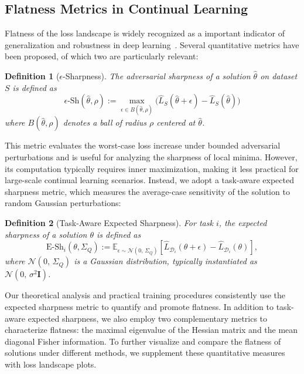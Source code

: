 \documentclass[letterpaper]{article} %
\newtheorem{definition}{Definition}
\begin{document}
\subsection{Flatness Metrics in Continual Learning}


Flatness of the loss landscape is widely recognized as a important indicator of generalization and robustness in deep learning~\citep{liVisualizingLossLandscape2018, foretSharpnessAwareMinimizationEfficiently2021}. Several quantitative metrics have been proposed, of which two are particularly relevant:

\begin{definition}[$\epsilon$-Sharpness]
The adversarial sharpness of a solution $\hat{\theta}$ on dataset $S$ is defined as
\begin{equation}
    \epsilon\text{-Sh}(\hat{\theta}, \rho) :=\max_{\epsilon \in B(\hat\theta, \rho)} \big( \hat{L}_{S}(\hat{\theta} + \epsilon) - \hat{L}_{S}(\hat{\theta}) \big)
\end{equation}
where $B(\hat\theta, \rho)$ denotes a ball of radius $\rho$ centered at $\hat\theta$.
\end{definition}

This metric evaluates the worst-case loss increase under bounded adversarial perturbations and is useful for analyzing the sharpness of local minima. However, its computation typically requires inner maximization, making it less practical for large-scale continual learning scenarios. Instead, we adopt a task-aware expected sharpness metric, which measures the average-case sensitivity of the solution to random Gaussian perturbations:

\begin{definition}[Task-Aware Expected Sharpness]
For task $i$, the expected sharpness of a solution $\theta$ is defined as
\begin{equation}
    \mathrm{E\text{-}Sh}_i(\theta, \Sigma_Q) := \mathbb{E}_{\epsilon \sim \mathcal{N}(0,\,\Sigma_Q)} \left[ \hat{L}_{\mathcal{D}_i}(\theta + \epsilon) - \hat{L}_{\mathcal{D}_i}(\theta) \right],
\end{equation}
where $\mathcal{N}(0,\,\Sigma_Q)$ is a Gaussian distribution, typically instantiated as $\mathcal{N}(0,\, \sigma^2 \mathbf{I})$.
\end{definition}

Our theoretical analysis and practical training procedures consistently use the expected sharpness metric to quantify and promote flatness. In addition to task-aware expected sharpness, we also employ two complementary metrics to characterize flatness: the maximal eigenvalue of the Hessian matrix and the mean diagonal Fisher information. To further visualize and compare the flatness of solutions under different methods, we supplement these quantitative measures with loss landscape plots.
\end{document}

